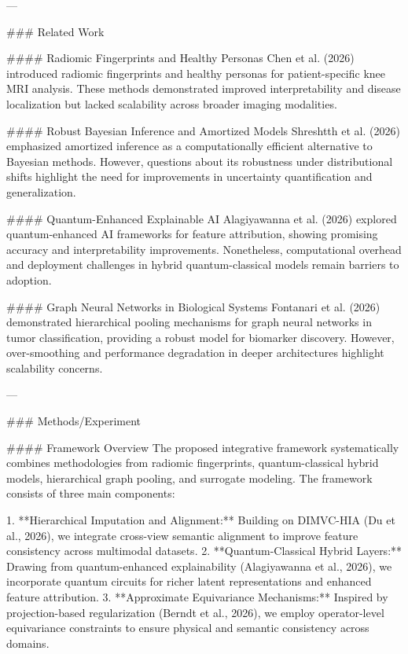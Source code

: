 ---

### Related Work  

#### Radiomic Fingerprints and Healthy Personas  
Chen et al. (2026) introduced radiomic fingerprints and healthy personas for patient-specific knee MRI analysis. These methods demonstrated improved interpretability and disease localization but lacked scalability across broader imaging modalities.  

#### Robust Bayesian Inference and Amortized Models  
Shreshtth et al. (2026) emphasized amortized inference as a computationally efficient alternative to Bayesian methods. However, questions about its robustness under distributional shifts highlight the need for improvements in uncertainty quantification and generalization.  

#### Quantum-Enhanced Explainable AI  
Alagiyawanna et al. (2026) explored quantum-enhanced AI frameworks for feature attribution, showing promising accuracy and interpretability improvements. Nonetheless, computational overhead and deployment challenges in hybrid quantum-classical models remain barriers to adoption.  

#### Graph Neural Networks in Biological Systems  
Fontanari et al. (2026) demonstrated hierarchical pooling mechanisms for graph neural networks in tumor classification, providing a robust model for biomarker discovery. However, over-smoothing and performance degradation in deeper architectures highlight scalability concerns.  

---

### Methods/Experiment  

#### Framework Overview  
The proposed integrative framework systematically combines methodologies from radiomic fingerprints, quantum-classical hybrid models, hierarchical graph pooling, and surrogate modeling. The framework consists of three main components:  

1. **Hierarchical Imputation and Alignment:** Building on DIMVC-HIA (Du et al., 2026), we integrate cross-view semantic alignment to improve feature consistency across multimodal datasets.  
2. **Quantum-Classical Hybrid Layers:** Drawing from quantum-enhanced explainability (Alagiyawanna et al., 2026), we incorporate quantum circuits for richer latent representations and enhanced feature attribution.  
3. **Approximate Equivariance Mechanisms:** Inspired by projection-based regularization (Berndt et al., 2026), we employ operator-level equivariance constraints to ensure physical and semantic consistency across domains.  

